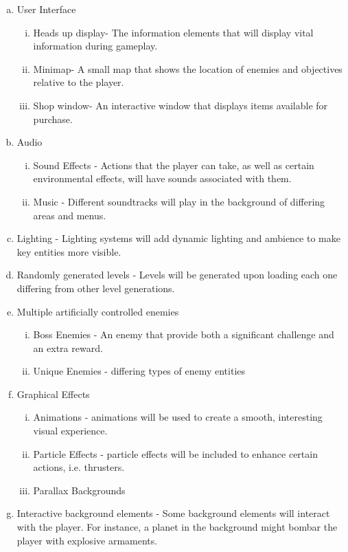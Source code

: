 \documentclass[12pt]{article}       %
\begin{document}
\begin{enumerate}[A.]
\begin{enumerate}[a.]
\item User Interface
\begin{enumerate}[i.]
\item Heads up display- The information elements that will display vital information during gameplay.
\item Minimap- A small map that shows the location of enemies and objectives relative to the player.
\item Shop window- An interactive window that displays items available for purchase.
\end{enumerate}

\item Audio
\begin{enumerate}[i.]
\item Sound Effects - Actions that the player can take, as well as certain environmental effects, will have sounds associated with them.
\item Music - Different soundtracks will play in the background of differing areas and menus.
\end{enumerate}

\item Lighting - Lighting systems will add dynamic lighting and ambience to make key entities more visible.

\item Randomly generated levels - Levels will be generated upon loading each one differing from other level generations.

\item Multiple artificially controlled enemies
\begin{enumerate}[i.]
\item Boss Enemies - An enemy that provide both a significant challenge and an extra reward.
\item Unique Enemies - differing types of enemy entities
\end{enumerate}

\item Graphical Effects
\begin{enumerate}[i.]
\item Animations - animations will be used to create a smooth, interesting visual experience.
\item Particle Effects - particle effects will be included to enhance certain actions, i.e. thrusters.
\item Parallax Backgrounds
\end{enumerate}

\item Interactive background elements - Some background elements will interact with the player. For instance, a planet in the background might bombar the player with explosive armaments.

\end{enumerate}
\end{enumerate}
\end{document}
